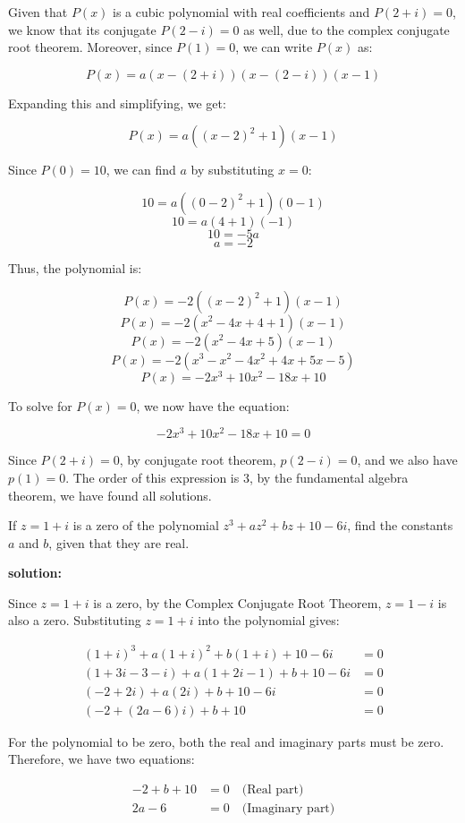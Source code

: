 Given that \(P(x)\) is a cubic polynomial with real coefficients and \(P(2 + i) = 0\), we know that its conjugate \(P(2 - i) = 0\) as well, due to the complex conjugate root theorem. Moreover, since \(P(1) = 0\), we can write \(P(x)\) as:

\[ P(x) = a(x - (2 + i))(x - (2 - i))(x - 1) \]

Expanding this and simplifying, we get:

\[ P(x) = a((x - 2)^2 + 1)(x - 1) \]

Since \(P(0) = 10\), we can find \(a\) by substituting \(x = 0\):

\[ 10 = a((0 - 2)^2 + 1)(0 - 1) \]
\[ 10 = a(4 + 1)(-1) \]
\[ 10 = -5a \]
\[ a = -2 \]

Thus, the polynomial is:

\[ P(x) = -2((x - 2)^2 + 1)(x - 1) \]
\[ P(x) = -2(x^2 - 4x + 4 + 1)(x - 1) \]
\[ P(x) = -2(x^2 - 4x + 5)(x - 1) \]
\[ P(x) = -2(x^3 - x^2 - 4x^2 + 4x + 5x - 5) \]
\[ P(x) = -2x^3 + 10x^2 - 18x + 10 \]

To solve for \(P(x) = 0\), we now have the equation:

\[ -2x^3 + 10x^2 - 18x + 10 = 0 \]

Since $P(2+i) = 0$, by conjugate root theorem, $p(2-i) = 0$, and we also have $p(1) = 0$.
The order of this expression is 3, by the fundamental algebra theorem, we have found all solutions.

\begin{exercise}
    If \( z = 1 + i \) is a zero of the polynomial \( z^3 + az^2 + bz + 10 - 6i \), find the constants \( a \) and \( b \), given that they are real.
\end{exercise}
\textbf{solution:}

Since \( z = 1 + i \) is a zero, by the Complex Conjugate Root Theorem, \( z = 1 - i \) is also a zero. Substituting \( z = 1 + i \) into the polynomial gives:

\begin{align*}
(1 + i)^3 + a(1 + i)^2 + b(1 + i) + 10 - 6i &= 0 \\
(1 + 3i - 3 - i) + a(1 + 2i - 1) + b + 10 - 6i &= 0 \\
(-2 + 2i) + a(2i) + b + 10 - 6i &= 0 \\
(-2 + (2a - 6)i) + b + 10 &= 0
\end{align*}

For the polynomial to be zero, both the real and imaginary parts must be zero. Therefore, we have two equations:

\begin{align*}
-2 + b + 10 &= 0 \quad \text{(Real part)} \\
2a - 6 &= 0 \quad \text{(Imaginary part)}
\end{align*}

